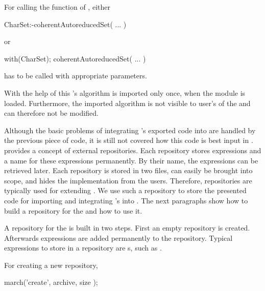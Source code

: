 For calling the  function of , either
\begin{mapleprogram}
CharSet:-coherentAutoreducedSet( ... )
\end{mapleprogram}

or 

\begin{mapleprogram}
with(CharSet);
coherentAutoreducedSet( ... )
\end{mapleprogram}

has to be called with appropriate parameters.

With the help of this  \Aldor's \exportedsymbol algorithm is imported only once, when the module is loaded. Furthermore, the imported algorithm is not visible to user's of the  and can therefore not be modified.

Although the basic problems of integrating \Aldor's exported code into \Maple are handled by the previous piece of code, it is still not covered how this code is best input in \Maple. \Maple provides a concept of external repositories. Each \Maple repository stores \Maple expressions and a name for these \Maple expressions permanently. By their name, the \Maple expressions can be retrieved later. Each \Maple repository is stored in two files, can easily be brought into scope, and hides the implementation from the users. Therefore, \Maple repositories are typically used for extending \Maple. We use such a repository to store the presented \Maple code for importing and integrating \Aldor's \exportedsymbol into \Maple. The next paragraphs show how to build a \Maple repository for the   and how to use it.

A \Maple repository for the   is built in two steps. First an empty repository is created. Afterwards expressions are added permanently to the repository. Typical expressions to store in a repository are s, such as .

For creating a new \Maple repository, 

\begin{mapleprogram}
march('create', archive, size );
\end{mapleprogram}

